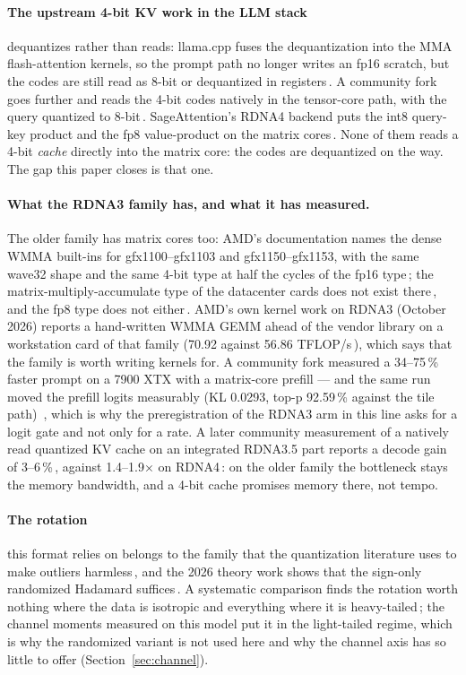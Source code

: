 \documentclass[10pt,twocolumn]{article}
\begin{document}
\paragraph{The upstream 4-bit KV work in the LLM stack} dequantizes rather than reads: llama.cpp fuses the
dequantization into the MMA flash-attention kernels, so the prompt path no longer writes an fp16 scratch,
but the codes are still read as 8-bit or dequantized in registers\,\cite{llamacpp-pr}. A community fork
goes further and reads the 4-bit codes natively in the tensor-core path, with the query quantized to
8-bit\,\cite{torad}. SageAttention's RDNA4 backend puts the int8 query-key product and the fp8
value-product on the matrix cores\,\cite{sage}. None of them reads a 4-bit \emph{cache} directly into the
matrix core: the codes are dequantized on the way. The gap this paper closes is that one.

\paragraph{What the RDNA3 family has, and what it has measured.} The older family has matrix cores too:
AMD's documentation names the dense WMMA built-ins for gfx1100--gfx1103 and gfx1150--gfx1153, with the
same wave32 shape and the same 4-bit type at half the cycles of the fp16 type\,\cite{amdwmg,amdcalc}; the
matrix-multiply-accumulate type of the datacenter cards does not exist there\,\cite{amdcalc}, and the fp8
type does not either\,\cite{rocwmma}. AMD's own kernel work on RDNA3 (October 2026) reports a hand-written
WMMA GEMM ahead of the vendor library on a workstation card of that family (70.92 against 56.86
TFLOP/s\,\cite{amdbl}), which says that the family is worth writing kernels for. A community fork
measured a 34--75\,\% faster prompt on a 7900 XTX with a matrix-core prefill --- and the same run moved
the prefill logits measurably (KL 0.0293, top-p 92.59\,\% against the tile path)\,
\cite{stew}, which is why the preregistration of the RDNA3 arm in this line asks for a logit gate and not
only for a rate. A later community measurement of a natively read quantized KV cache on an integrated
RDNA3.5 part reports a decode gain of 3--6\,\%\,\cite{llamacpp-gfx1151}, against 1.4--1.9$\times$ on
RDNA4\,\cite{llamacpp-pr}: on the older family the bottleneck stays the memory bandwidth, and a 4-bit cache
promises memory there, not tempo.


\paragraph{The rotation} this format relies on belongs to the family that the quantization literature uses
to make outliers harmless\,\cite{quarot,rotatekv}, and the 2026 theory work shows that the sign-only
randomized Hadamard suffices\,\cite{rht-theory}. A systematic comparison finds the rotation worth nothing
where the data is isotropic and everything where it is heavy-tailed\,\cite{amd-kv-ablation}; the channel
moments measured on this model put it in the light-tailed regime, which is why the randomized variant is
not used here and why the channel axis has so little to offer (Section~\ref{sec:channel}).
\end{document}
